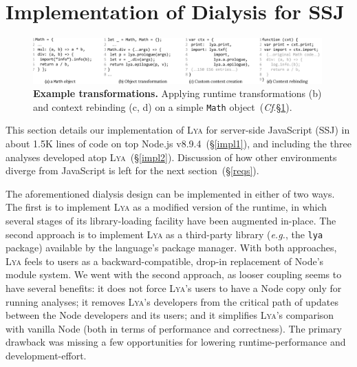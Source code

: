 \documentclass[letterpaper,twocolumn,10pt]{article}
\def\eg{{\em e.g.}, }
\newcommand{\ttt}[1]{\texttt{#1}}
\newcommand{\cf}[1]{(\emph{Cf}.\S\ref{#1})}
\newcommand{\sx}[1]{(\S\ref{#1})}
\newcommand{\sys}{{\scshape Lya}\xspace}
\begin{document}
\section{Implementation of Dialysis for SSJ}
\label{impl}

\begin{figure}[t]
\centering
\includegraphics[width=0.99\textwidth]{./figs/lya_ex2.pdf}
\vspace{-2mm}
\caption{
  \textbf{Example transformations.}
   Applying runtime transformations (b) and context rebinding (c, d) on a simple \ttt{Math} object~\cf{impl}.
}
\label{fig:ex2}
\vspace{-4mm}
\end{figure}


This section details our implementation of \sys for server-side JavaScript (SSJ) in about 1.5K lines of code on top Node.js v8.9.4~\sx{impl1}, and 
including the three analyses developed atop \sys~\sx{impl2}.
Discussion of how other environments diverge from JavaScript is left for the next section~\sx{reqs}.

The aforementioned dialysis design can be implemented in either of two ways.
The first is to implement \sys as a modified version of the runtime, in which several stages of its library-loading facility have been augmented in-place. %
The second approach is to implement \sys as a third-party library (\eg the \ttt{lya} package) available by the language's package manager.
% 
With both approaches, \sys feels to users as a backward-compatible, drop-in replacement of Node's module system.
We went with the second approach, as looser coupling seems to have several benefits:
  it does not force \sys's users to have a Node copy only for running analyses;
  it removes \sys's developers from the critical path of updates between the Node developers and its users; 
  and it simplifies \sys's comparison with vanilla Node (both in terms of performance and correctness).
The primary drawback was missing a few opportunities for lowering runtime-performance and development-effort.

\end{document}
